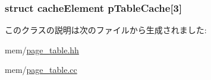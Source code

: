 \label{classPageTable_af6a1d4146effcb66a42a1a50cdedd71c}
\hypertarget{classPageTable_a6eb3f78e407d321f98bdaacc9d2768a6}{
\subsubsection[{pTableCache}]{\setlength{\rightskip}{0pt plus 5cm}struct {\bf cacheElement} {\bf pTableCache}\mbox{[}3\mbox{]}}}
\label{classPageTable_a6eb3f78e407d321f98bdaacc9d2768a6}


このクラスの説明は次のファイルから生成されました:\begin{DoxyCompactItemize}
\item 
mem/\hyperlink{page__table_8hh}{page\_\-table.hh}\item 
mem/\hyperlink{page__table_8cc}{page\_\-table.cc}\end{DoxyCompactItemize}
